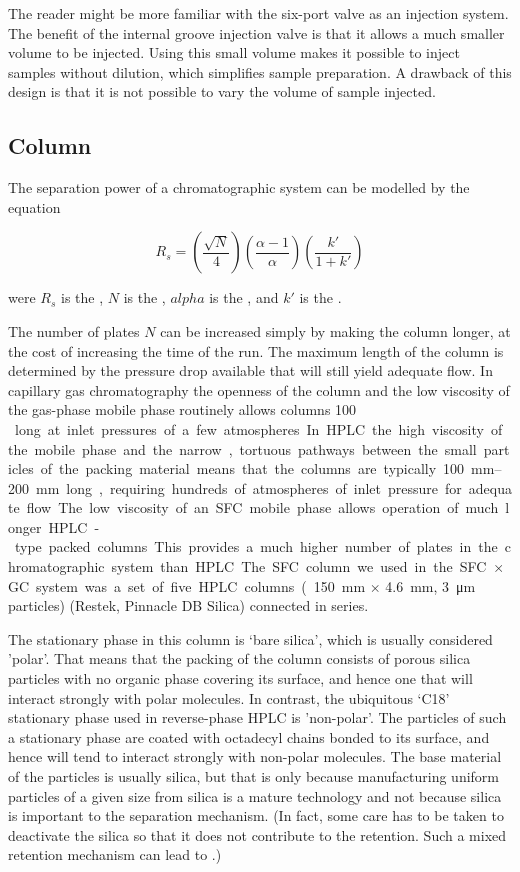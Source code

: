 The reader might be more familiar with the six-port valve as an injection
system. The benefit of the internal groove injection valve is that it allows a
much smaller volume to be injected. Using this small volume makes it possible to
inject samples without dilution, which simplifies sample preparation. A drawback
of this design is that it is not possible to vary the volume of sample injected.


\subsection{Column}
\label{sec:SFCColumn}

The separation power of a chromatographic system can be modelled by the equation 

\[
 R_s = \left(\frac{\sqrt{N}}{4}\right)  \left(\frac{\alpha-1}{\alpha}\right)  \left(\frac{k'}{1+k'}\right)
\]

were \(R_s\) is the , \(N\) is the , \(alpha\) is the , and \(k'\) is the
.
 
The number of plates \(N\) can be increased simply by making the column longer,
at the cost of increasing the time of the run. The maximum length of the column
is determined by the pressure drop available that will still yield adequate
flow. In capillary gas chromatography the openness of the column and the low
viscosity of the gas-phase mobile phase routinely allows columns \SI{100}{\metre
}long at inlet pressures of a few atmospheres. In HPLC the high viscosity of the
mobile phase and the narrow, tortuous pathways between the small particles of
the packing material means that the columns are typically
\SIrange{100}{200}{\milli\metre} long, requiring hundreds of atmospheres of
inlet pressure for adequate flow.

The low viscosity of an SFC mobile phase allows operation of much longer
HPLC-type packed columns. This provides a much higher number of plates in the
chromatographic system than HPLC. The SFC column we used in the SFC×GC system
was a set of five HPLC columns (\SI{150}{\milli\metre} $\times$
\SI{4.6}{\milli\metre}, \SI{3}{\micro\metre} particles) (Restek, Pinnacle DB
Silica) connected in series.

The stationary phase in this column is `bare silica', which is usually
considered 'polar'. That means that the packing of the column consists of porous
silica particles with no organic phase covering its surface, and hence one that
will interact strongly with polar molecules. In contrast, the ubiquitous `C18'
stationary phase used in reverse-phase HPLC is 'non-polar'. The particles of
such a stationary phase are coated with octadecyl chains bonded to its surface,
and hence will tend to interact strongly with non-polar molecules. The base
material of the particles is usually silica, but that is only because
manufacturing uniform particles of a given size from silica is a mature
technology and not because silica is important to the separation mechanism. (In
fact, some care has to be taken to deactivate the silica so that it does not
contribute to the retention. Such a mixed retention mechanism can lead to
.)

